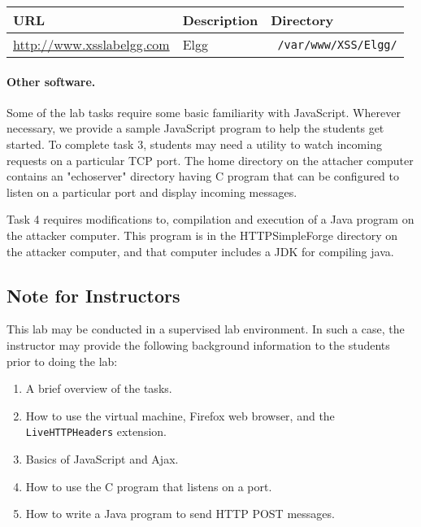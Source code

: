\newcommand{\urlorurls}{URL }
\newcommand{\urlisorurlsare}{URL is }





\vspace{0.1in}
\begin{tabular}{|l|l|l|}
\hline
URL & Description & Directory\\
\hline
\url{http://www.xsslabelgg.com} & Elgg & {\tt
/var/www/XSS/Elgg/} \\
\hline
\end{tabular}
\vspace{0.1in}




\paragraph{Other software.}
Some of the lab tasks require some basic familiarity with
JavaScript. Wherever necessary, we provide a sample JavaScript program
to help the students get started. To complete task 3, students may
need a utility to watch incoming requests on a particular TCP port. The
home directory on the attacher computer contains an "echoserver" directory having
C program that can be configured to listen on a particular
port and display incoming messages. 

Task 4 requires modifications to, compilation and execution of a Java program
on the attacker computer.  This program is in the HTTPSimpleForge directory
on the attacker computer, and that computer includes a JDK for compiling java.


\subsection{Note for Instructors} 

This lab may be conducted in a
supervised lab environment. In such a case, the instructor may provide
the following background information to the students prior to doing
the lab:
\begin{enumerate}
  \item A brief overview of the tasks.
  \item How to use the virtual machine, Firefox web browser, and the
    {\tt LiveHTTPHeaders} extension.
  \item Basics of JavaScript and Ajax.
  \item How to use the C program that listens on a port. 
  \item How to write a Java program to send HTTP POST messages. 	
\end{enumerate}

